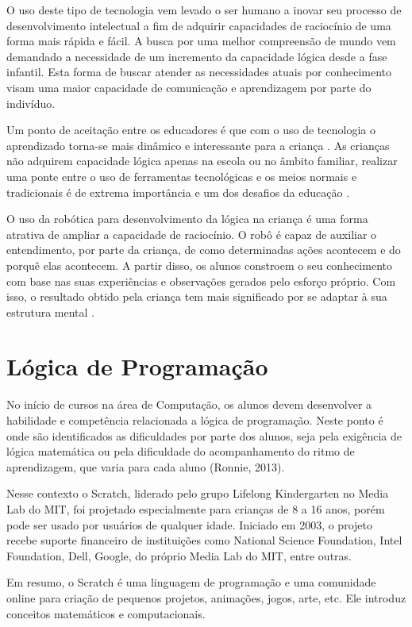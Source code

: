 O uso deste tipo de tecnologia vem levado o ser humano a inovar seu processo de desenvolvimento intelectual a fim de adquirir capacidades de raciocínio de uma forma mais rápida e fácil. A busca por uma melhor compreensão de mundo vem demandado a necessidade de um incremento da capacidade lógica desde a fase infantil. Esta forma de buscar atender as necessidades atuais por conhecimento visam uma maior capacidade de comunicação e aprendizagem por parte do indivíduo.

Um ponto de aceitação entre os educadores é que com o uso de tecnologia o aprendizado torna-se mais dinâmico e interessante para a criança \cite{zilli:2004}. As crianças não adquirem capacidade lógica apenas na escola ou no âmbito familiar, realizar uma ponte entre o uso de ferramentas tecnológicas e os meios normais e tradicionais é de extrema importância e um dos desafios da educação \cite{yus:2004}.

O uso da robótica para desenvolvimento da lógica na criança é uma forma atrativa de ampliar a capacidade de raciocínio. O robô é capaz de auxiliar o entendimento, por parte da criança, de como determinadas ações acontecem e do porquê elas acontecem. A partir disso, os alunos constroem o seu conhecimento com base nas suas experiências e observações gerados pelo esforço próprio. Com isso, o resultado obtido pela criança tem mais significado por se adaptar à sua estrutura mental \cite{zilli:2004}.

\section{Lógica de Programação}
No início de cursos na área de Computação, os alunos devem desenvolver a habilidade e competência relacionada a lógica de programação. Neste ponto é onde são identificados as dificuldades por parte dos alunos, seja pela exigência de lógica matemática ou pela dificuldade do acompanhamento do ritmo de aprendizagem, que varia para cada aluno (Ronnie, 2013).

Nesse contexto o Scratch, liderado pelo grupo Lifelong Kindergarten no Media Lab do MIT, foi projetado especialmente para crianças de 8 a 16 anos, porém pode ser usado por usuários de qualquer idade. Iniciado em 2003, o projeto recebe suporte financeiro de instituições como National Science Foundation, Intel Foundation, Dell, Google, do próprio Media Lab do MIT, entre outras.

Em resumo, o Scratch é uma linguagem de programação e uma comunidade online para criação de pequenos projetos, animações, jogos, arte, etc. Ele introduz conceitos matemáticos e computacionais.

